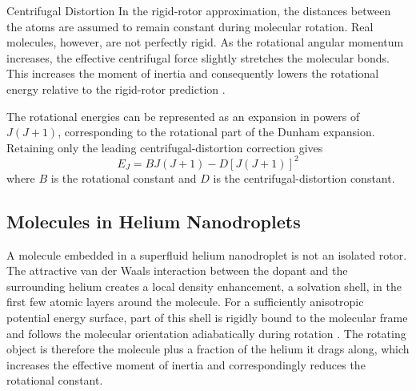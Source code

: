 \begin{aside}{Centrifugal Distortion}
In the rigid-rotor approximation, the distances between the atoms are assumed to remain constant during molecular rotation. Real molecules, however, are not perfectly rigid. As the rotational angular momentum increases, the effective centrifugal force slightly stretches the molecular bonds. This increases the moment of inertia and consequently lowers the rotational energy relative to the rigid-rotor prediction \cite{mcnabRotationalSpectroscopyTheory2017}.

The rotational energies can be represented as an expansion in powers of $J(J+1)$, corresponding to the rotational part of the Dunham expansion. Retaining only the leading centrifugal-distortion correction gives
\begin{equation}
    E_J = B J(J+1) - D\left[J(J+1)\right]^2
    \label{eq:centrifugal_distortion}
\end{equation}
where $B$ is the rotational constant and $D$ is the centrifugal-distortion constant.
\end{aside}

\subsection{Molecules in Helium Nanodroplets}

A molecule embedded in a superfluid helium nanodroplet is not an isolated rotor. The attractive van der Waals interaction between the dopant and the surrounding helium creates a local density enhancement, a solvation shell, in the first few atomic layers around the molecule. For a sufficiently anisotropic potential energy surface, part of this shell is rigidly bound to the molecular frame and follows the molecular orientation adiabatically during rotation \cite{grebenevRotationalSpectrumSingle2000, choiInfraredSpectroscopyHelium2006a}. The rotating object is therefore the molecule plus a fraction of the helium it drags along, which increases the effective moment of inertia and correspondingly reduces the rotational constant.

